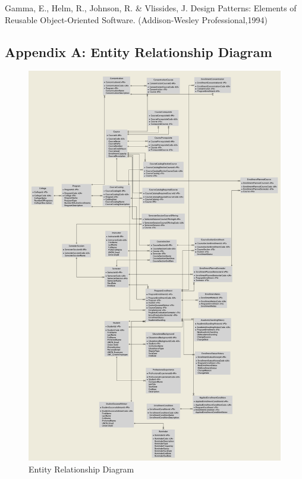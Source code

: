 \documentclass[12pt]{article}
\begin{document}
\newpage
\begin{thebibliography}{l}
     Gamma, E., Helm, R., Johnson, R. \& Vlissides, J. Design Patterns: Elements of Reusable Object-Oriented Software. (Addison-Wesley Professional,1994)
\end{thebibliography}

\newpage
\begin{appendices}
\section{Appendix A: Entity Relationship Diagram}
    \begin{figure}[ht]
        \centering
        \includegraphics[trim={0 40cm 0 0},clip,width=\textwidth]{entity-relationship-diagram-with-attr}
        \caption{Entity Relationship Diagram}
        \label{fig:entity-relationship-diagram-with-attr1}
    \end{figure}
    

\end{appendices}
\end{document}

